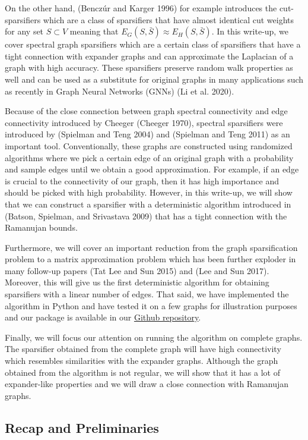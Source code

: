 \documentclass[
  letterpaper,
  DIV=11,
  numbers=noendperiod]{scrartcl}
\theoremstyle{plain}
\theoremstyle{plain}
\theoremstyle{plain}
\theoremstyle{definition}
\theoremstyle{plain}
\theoremstyle{remark}
\begin{document}
On the other hand, (Benczúr and Karger 1996) for example introduces the
cut-sparsifiers which are a class of sparsifiers that have almost
identical cut weights for any set \(S \subset V\) meaning that
\(E_G(S, \bar{S}) \approx E_H(S, \bar{S})\). In this write-up, we cover
spectral graph sparsifiers which are a certain class of sparsifiers that
have a tight connection with expander graphs and can approximate the
Laplacian of a graph with high accuracy. These sparsifiers preserve
random walk properties as well and can be used as a substitute for
original graphs in many applications such as recently in Graph Neural
Networks (GNNs) (Li et al. 2020).

Because of the close connection between graph spectral connectivity and
edge connectivity introduced by Cheeger (Cheeger 1970), spectral
sparsifiers were introduced by (Spielman and Teng 2004) and (Spielman
and Teng 2011) as an important tool. Conventionally, these graphs are
constructed using randomized algorithms where we pick a certain edge of
an original graph with a probability and sample edges until we obtain a
good approximation. For example, if an edge is crucial to the
connectivity of our graph, then it has high importance and should be
picked with high probability. However, in this write-up, we will show
that we can construct a sparsifier with a deterministic algorithm
introduced in (Batson, Spielman, and Srivastava 2009) that has a tight
connection with the Ramanujan bounds.

Furthermore, we will cover an important reduction from the graph
sparsification problem to a matrix approximation problem which has been
further exploder in many follow-up papers (Tat Lee and Sun 2015) and
(Lee and Sun 2017). Moreover, this will give us the first deterministic
algorithm for obtaining sparsifiers with a linear number of edges. That
said, we have implemented the algorithm in Python and have tested it on
a few graphs for illustration purposes and our package is available in
our
\href{https://github.com/HamidrezaKmK/twice-ramanujan-sparsifiers}{Github
repository}.

Finally, we will focus our attention on running the algorithm on
complete graphs. The sparsifier obtained from the complete graph will
have high connectivity which resembles similarities with the expander
graphs. Although the graph obtained from the algorithm is not regular,
we will show that it has a lot of expander-like properties and we will
draw a close connection with Ramanujan graphs.

\hypertarget{recap-and-preliminaries}{%
\subsection{Recap and Preliminaries}\label{recap-and-preliminaries}}
\end{document}
